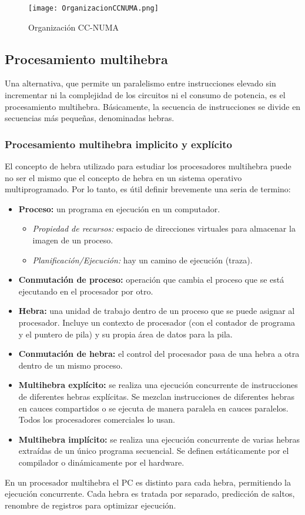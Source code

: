 \begin{figure}[H]
  \centering
  \texttt{[image: OrganizacionCCNUMA.png]}
  \caption{Organización CC-NUMA}
\end{figure}

\subsection{Procesamiento multihebra}

Una alternativa, que permite un paralelismo entre instrucciones elevado sin incrementar ni la complejidad de los circuitos ni el consumo de potencia, es el procesamiento multihebra. Básicamente, la secuencia de instrucciones se divide en secuencias más pequeñas, denominadas hebras.

\subsubsection{Procesamiento multihebra implicito y explícito}

El concepto de hebra utilizado para estudiar los procesadores multihebra puede no ser el mismo que el concepto de hebra en un sistema operativo multiprogramado. Por lo tanto, es útil definir brevemente una seria de termino:

\begin{itemize}
  \item \textbf{Proceso:} un programa en ejecución en un computador.
  \begin{itemize}
    \item \textit{Propiedad de recursos:} espacio de direcciones virtuales para almacenar la imagen de un proceso.
    \item \textit{Planificación/Ejecución:} hay un camino de ejecución (traza).
  \end{itemize}
  \item \textbf{Conmutación de proceso:} operación que cambia el proceso que se está ejecutando en el procesador por otro.
  \item \textbf{Hebra:} una unidad de trabajo dentro de un proceso que se puede asignar al procesador. Incluye un contexto de procesador (con el contador de programa y el puntero de pila) y su propia área de datos para la pila.
  \item \textbf{Conmutación de hebra:} el control del procesador pasa de una hebra a otra dentro de un mismo proceso.
\end{itemize}

\begin{itemize}
  \item \textbf{Multihebra explícito:} se realiza una ejecución concurrente de instrucciones de diferentes hebras explícitas. Se mezclan instrucciones de diferentes hebras en cauces compartidos o se ejecuta de manera paralela en cauces paralelos. Todos los procesadores comerciales lo usan.
  \item \textbf{Multihebra implícito:} se realiza una ejecución concurrente de varias hebras extraídas de un único programa secuencial. Se definen estáticamente por el compilador o dinámicamente por el hardware.
\end{itemize}

En un procesador multihebra el PC es distinto para cada hebra, permitiendo la ejecución concurrente. Cada hebra es tratada por separado, predicción de saltos, renombre de registros para optimizar ejecución.